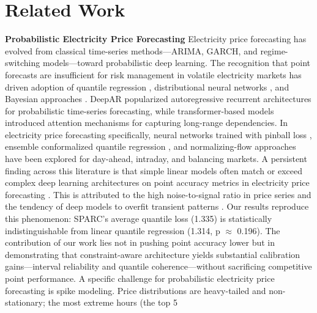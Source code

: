 \section{Related Work}
\textbf{Probabilistic Electricity Price Forecasting}
Electricity price forecasting has evolved from classical time-series methods---ARIMA, GARCH, and regime-switching models---toward probabilistic deep learning. The recognition that point forecasts are insufficient for risk management in volatile electricity markets \cite{bessa2017improved} has driven adoption of quantile regression \cite{taieb2016forecasting}, distributional neural networks \cite{toubeau2018deep}, and Bayesian approaches \cite{brusaferri2019bayesian}. DeepAR \cite{wen2017multihorizon} popularized autoregressive recurrent architectures for probabilistic time-series forecasting, while transformer-based models \cite{lim2020temporal, cantilloluna2023intraday} introduced attention mechanisms for capturing long-range dependencies. In electricity price forecasting specifically, neural networks trained with pinball loss \cite{marcjasz2023distributional}, ensemble conformalized quantile regression \cite{jensen2022ensemble}, and normalizing-flow approaches \cite{hilger2023multivariate} have been explored for day-ahead, intraday, and balancing markets.
A persistent finding across this literature is that simple linear models often match or exceed complex deep learning architectures on point accuracy metrics in electricity price forecasting \cite{uniejewski2018efficient, marcjasz2020neural}. This is attributed to the high noise-to-signal ratio in price series and the tendency of deep models to overfit transient patterns \cite{lago2020forecasting}. Our results reproduce this phenomenon: SPARC's average quantile loss (1.335) is statistically indistinguishable from linear quantile regression (1.314, p $\approx$ 0.196). The contribution of our work lies not in pushing point accuracy lower but in demonstrating that constraint-aware architecture yields substantial calibration gains---interval reliability and quantile coherence---without sacrificing competitive point performance.
A specific challenge for probabilistic electricity price forecasting is spike modeling. Price distributions are heavy-tailed and non-stationary; the most extreme hours (the top 5%
